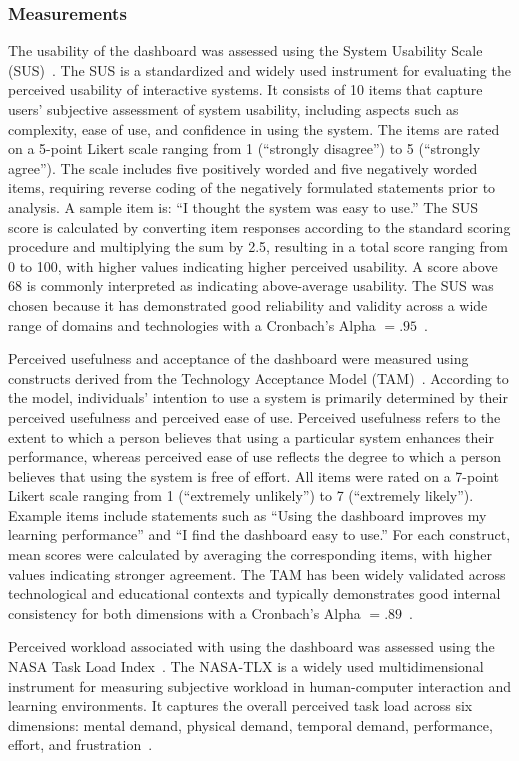 \subsubsection{Measurements}

The usability of the dashboard was assessed using the System Usability Scale (SUS)~\cite{germanupa_sus}. The SUS is a standardized and widely used instrument for evaluating the perceived usability of interactive systems. It consists of 10 items that capture users' subjective assessment of system usability, including aspects such as complexity, ease of use, and confidence in using the system. The items are rated on a 5-point Likert scale ranging from 1 (``strongly disagree'') to 5 (``strongly agree''). The scale includes five positively worded and five negatively worded items, requiring reverse coding of the negatively formulated statements prior to analysis. A sample item is: ``I thought the system was easy to use.'' The SUS score is calculated by converting item responses according to the standard scoring procedure and multiplying the sum by 2.5, resulting in a total score ranging from 0 to 100, with higher values indicating higher perceived usability. A score above 68 is commonly interpreted as indicating above-average usability. The SUS was chosen because it has demonstrated good reliability and validity across a wide range of domains and technologies with a Cronbach's Alpha $=.95$~\cite{chu2019usability}.

Perceived usefulness and acceptance of the dashboard were measured using constructs derived from the Technology Acceptance Model (TAM)~\cite{davis1989technology}. According to the model, individuals' intention to use a system is primarily determined by their perceived usefulness and perceived ease of use. Perceived usefulness refers to the extent to which a person believes that using a particular system enhances their performance, whereas perceived ease of use reflects the degree to which a person believes that using the system is free of effort. All items were rated on a 7-point Likert scale ranging from 1 (``extremely unlikely'') to 7 (``extremely likely''). Example items include statements such as ``Using the dashboard improves my learning performance'' and ``I find the dashboard easy to use.'' For each construct, mean scores were calculated by averaging the corresponding items, with higher values indicating stronger agreement. The TAM has been widely validated across technological and educational contexts and typically demonstrates good internal consistency for both dimensions with a Cronbach's Alpha $=.89$~\cite{masrom2007technology}.

Perceived workload associated with using the dashboard was assessed using the NASA Task Load Index~\cite{hart1988development}.
The NASA-TLX is a widely used multidimensional instrument for measuring subjective workload in human-computer interaction and learning environments. It captures the overall perceived task load across six dimensions: mental demand, physical demand, temporal demand, performance, effort, and frustration~\cite{hart1988development}.
